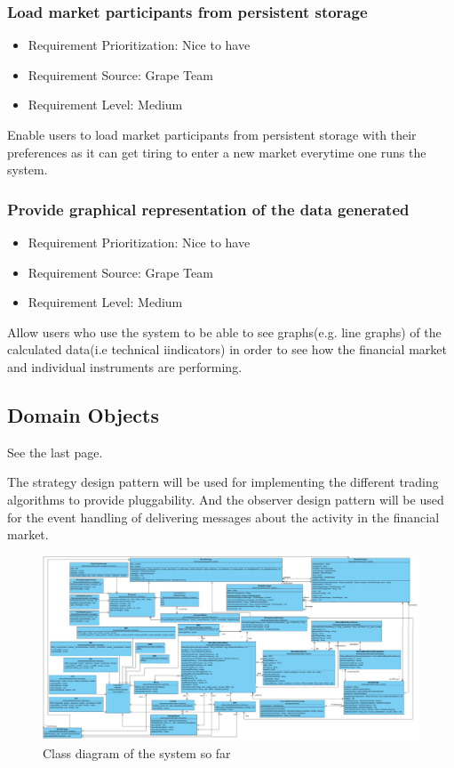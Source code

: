 \documentclass[12pt]{article}
\begin{document}
			\subsubsection{Load market participants from persistent storage}
			\begin{itemize}
				\item Requirement Prioritization: Nice to have
				\item Requirement Source: Grape Team 
				\item Requirement Level: Medium	
			\end{itemize}
			Enable users to load market participants from persistent storage with their preferences as it can get tiring to enter a new market everytime one runs the system. 
			
			\subsubsection{Provide graphical representation of the data generated}
			\begin{itemize}
				\item Requirement Prioritization: Nice to have
				\item Requirement Source: Grape Team 
				\item Requirement Level: Medium	
			\end{itemize}
			Allow users who use the system to be able to see graphs(e.g. line graphs) of the calculated data(i.e technical iindicators) in order to see how the financial market and individual instruments are performing.
					  
		\subsection{Domain Objects}	
		See the last page.
								
			The strategy design pattern will be used for implementing the different trading algorithms to provide pluggability.
			And the observer design pattern will be used for the event handling of delivering messages about the activity in the financial market.
		\clearpage 
		\newpage	
			\begin{figure}[th]
			\centering
			\vbox{\vspace{-5em}\includegraphics[scale=0.35, angle=90]{./ClassDiagram.jpg}}	
			\caption{Class diagram of the system so far}
			\label{domain objects}
			\end{figure}
		
\end{document}
